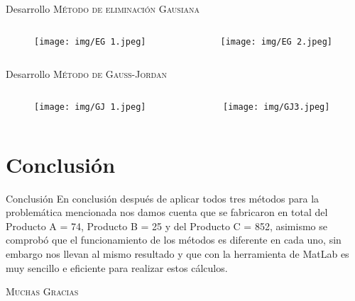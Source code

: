 \documentclass{cubeamer}
\begin{document}
\begin{frame}{Desarrollo}
    \textsc{Método de eliminación Gausiana}
   \begin{columns}
        \begin{column}{0.5\textwidth}
            \begin{figure}
                \centering
                \texttt{[image: img/EG 1.jpeg]}
            \end{figure}
        \end{column}
        \begin{column}{0.5\textwidth}
        \begin{figure}
                \centering
                \texttt{[image: img/EG 2.jpeg]}
            \end{figure}
        \end{column}
    \end{columns}   
    
\end{frame}

\begin{frame}{Desarrollo}
    \textsc{Método de Gauss-Jordan}
   \begin{columns}
        \begin{column}{0.5\textwidth}
            \begin{figure}
                \centering
                \texttt{[image: img/GJ 1.jpeg]}
            \end{figure}
        \end{column}
        \begin{column}{0.5\textwidth}
        \begin{figure}
                \centering
                \texttt{[image: img/GJ3.jpeg]}
            \end{figure}
        \end{column}
    \end{columns}   
    

\end{frame}


\section{Conclusión}

\begin{frame}{Conclusión}
  En conclusión después de aplicar todos tres métodos para la problemática mencionada nos damos cuenta que se fabricaron en total del Producto A = 74, Producto B = 25 y del Producto C = 852, asimismo se comprobó que el funcionamiento de los métodos es diferente en cada uno, sin embargo nos llevan al mismo resultado y que con la herramienta de MatLab es muy sencillo e eficiente para realizar estos cálculos.
\end{frame}

\begin{frame}[standout]
    \Huge\textsc{Muchas Gracias}
\end{frame}

\appendix
\end{document}
